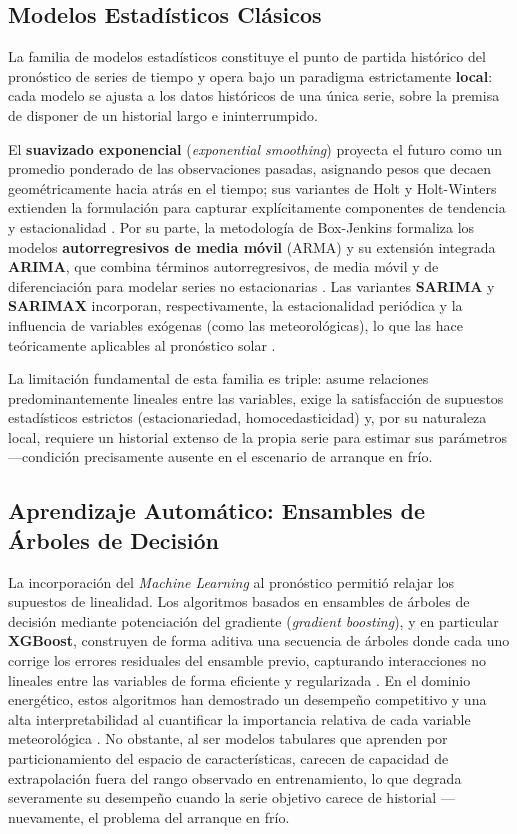 \subsection{Modelos Estadísticos Clásicos}
La familia de modelos estadísticos constituye el punto de partida histórico del pronóstico de series de tiempo y opera bajo un paradigma estrictamente \textbf{local}: cada modelo se ajusta a los datos históricos de una única serie, sobre la premisa de disponer de un historial largo e ininterrumpido.

El \textbf{suavizado exponencial} (\textit{exponential smoothing}) proyecta el futuro como un promedio ponderado de las observaciones pasadas, asignando pesos que decaen geométricamente hacia atrás en el tiempo; sus variantes de Holt y Holt-Winters extienden la formulación para capturar explícitamente componentes de tendencia y estacionalidad \cite{Peixeiro2022}. Por su parte, la metodología de Box-Jenkins formaliza los modelos \textbf{autorregresivos de media móvil} (ARMA) y su extensión integrada \textbf{ARIMA}, que combina términos autorregresivos, de media móvil y de diferenciación para modelar series no estacionarias \cite{Peixeiro2022}. Las variantes \textbf{SARIMA} y \textbf{SARIMAX} incorporan, respectivamente, la estacionalidad periódica y la influencia de variables exógenas (como las meteorológicas), lo que las hace teóricamente aplicables al pronóstico solar \cite{Peixeiro2022}.

La limitación fundamental de esta familia es triple: asume relaciones predominantemente lineales entre las variables, exige la satisfacción de supuestos estadísticos estrictos (estacionariedad, homocedasticidad) y, por su naturaleza local, requiere un historial extenso de la propia serie para estimar sus parámetros —condición precisamente ausente en el escenario de arranque en frío.

\subsection{Aprendizaje Automático: Ensambles de Árboles de Decisión}
La incorporación del \textit{Machine Learning} al pronóstico permitió relajar los supuestos de linealidad. Los algoritmos basados en ensambles de árboles de decisión mediante potenciación del gradiente (\textit{gradient boosting}), y en particular \textbf{XGBoost}, construyen de forma aditiva una secuencia de árboles donde cada uno corrige los errores residuales del ensamble previo, capturando interacciones no lineales entre las variables de forma eficiente y regularizada \cite{Chen2016}. En el dominio energético, estos algoritmos han demostrado un desempeño competitivo y una alta interpretabilidad al cuantificar la importancia relativa de cada variable meteorológica \cite{rodriguez2023energy}. No obstante, al ser modelos tabulares que aprenden por particionamiento del espacio de características, carecen de capacidad de extrapolación fuera del rango observado en entrenamiento, lo que degrada severamente su desempeño cuando la serie objetivo carece de historial —nuevamente, el problema del arranque en frío.

